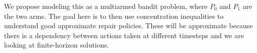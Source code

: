\documentclass[english]{article}
\numberwithin{equation}{section}
\begin{document}
We propose modeling this as a multiarmed bandit problem, where $P_0$ and $P_1$ are the two arms. The goal here is to then use concentration inequalities to understand good approximate repair policies. These will be approximate because there is a dependency between actions taken at different timesteps and we are looking at finite-horizon solutions.

%
%
%
%
%

\end{document}

